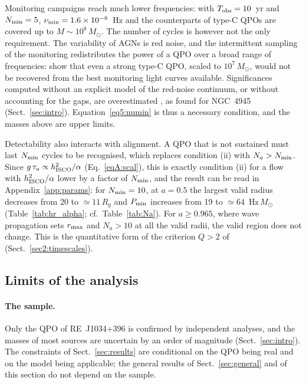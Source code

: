 Monitoring campaigns reach much lower frequencies: with $T_\textup{obs}=10$~yr and $N_\textup{min}=5$, $\nu_\textup{min}=1.6\times10^{-8}$~Hz and the counterparts of type-C QPOs are covered up to $M\sim10^8\,M_\odot$.
The number of cycles is however not the only requirement.
The variability of AGNs is red noise, and the intermittent sampling of the monitoring redistributes the power of a QPO over a broad range of frequencies: \citet{VaughanUttley2005} show that even a strong type-C QPO, scaled to $10^7\,M_\odot$, would not be recovered from the best monitoring light curves available.
Significances computed without an explicit model of the red-noise continuum, or without accounting for the gaps, are overestimated \citep{VaughanUttley2006,Gurpide2025}, as found for NGC~4945 (Sect.~\ref{sec:intro}).
Equation~\eqref{eq5:numin} is thus a necessary condition, and the masses above are upper limits.

Detectability also interacts with alignment.
A QPO that is not sustained must last $N_\textup{min}$ cycles to be recognised, which replaces condition (ii) with $N_a>N_\textup{min}$.
Since $g\,\tau_a\propto h_\textup{ISCO}^2/\alpha$ (Eq.~\ref{eqA:scal}), this is exactly condition (ii) for a flow with $h_\textup{ISCO}^2/\alpha$ lower by a factor of $N_\textup{min}$, and the result can be read in Appendix~\ref{app:params}: for $N_\textup{min}=10$, at $a=0.5$ the largest valid radius decreases from 20 to $\simeq11\,R_g$ and $P_\textup{min}$ increases from 19 to $\simeq64$~Hz\,$M_\odot$ (Table~\ref{tab:hr_alpha}; cf.\ Table~\ref{tab:Na}).
For $a\geq0.965$, where wave propagation sets $r_\textup{max}$ and $N_a>10$ at all the valid radii, the valid region does not change.
This is the quantitative form of the criterion $Q>2$ of \citet{Motta2017} (Sect.~\ref{sec2:timescales}).

\subsection{Limits of the analysis}
\label{sec5:caveats}

\paragraph{The sample.}
Only the QPO of RE~J1034+396 is confirmed by independent analyses, and the masses of most sources are uncertain by an order of magnitude (Sect.~\ref{sec:intro}).
The constraints of Sect.~\ref{sec:results} are conditional on the QPO being real and on the model being applicable; the general results of Sect.~\ref{sec:general} and of this section do not depend on the sample.

